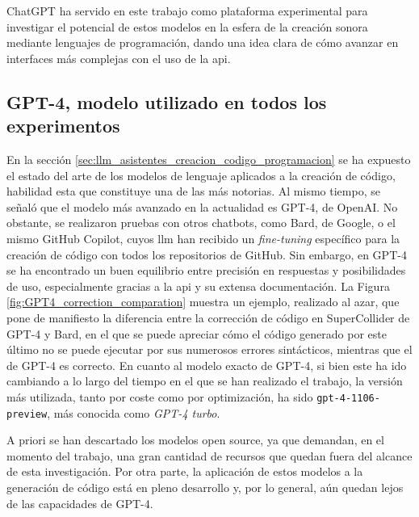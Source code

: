 ChatGPT ha servido en este trabajo como plataforma experimental para investigar el potencial de estos modelos en la esfera de la creación sonora mediante lenguajes de programación, dando una idea clara de cómo avanzar en interfaces más complejas con el uso de la \gls{api}.

\subsection{GPT-4, modelo utilizado en todos los experimentos}

En la sección \ref{sec:llm_asistentes_creacion_codigo_programacion} se ha expuesto el estado del arte de los modelos de lenguaje aplicados a la creación de código, habilidad esta que constituye una de las más notorias. Al mismo tiempo, se señaló que el modelo más avanzado en la actualidad es GPT-4, de OpenAI. No obstante, se realizaron pruebas con otros chatbots, como Bard, de Google, o el mismo GitHub Copilot, cuyos \gls{llm} han recibido un \emph{fine-tuning} específico para la creación de código con todos los repositorios de GitHub. Sin embargo, en GPT-4 se ha encontrado un buen equilibrio entre precisión en respuestas y posibilidades de uso, especialmente gracias a la \gls{api} y su extensa documentación. La Figura \ref{fig:GPT4_correction_comparation} muestra un ejemplo, realizado al azar, que pone de manifiesto la diferencia entre la corrección de código en SuperCollider de GPT-4 y Bard, en el que se puede apreciar cómo el código generado por este último no se puede ejecutar por sus numerosos errores sintácticos, mientras que el de GPT-4 es correcto. En cuanto al modelo exacto de GPT-4, si bien este ha ido cambiando a lo largo del tiempo en el que se han realizado el trabajo, la versión más utilizada, tanto por coste como por optimización, ha sido \texttt{gpt-4-1106-preview}, más conocida como \emph{GPT-4 turbo}.

A priori se han descartado los modelos open source, ya que demandan, en el momento del trabajo, una gran cantidad de recursos que quedan fuera del alcance de esta investigación. Por otra parte, la aplicación de estos modelos a la generación de código está en pleno desarrollo y, por lo general, aún quedan lejos de las capacidades de GPT-4.



